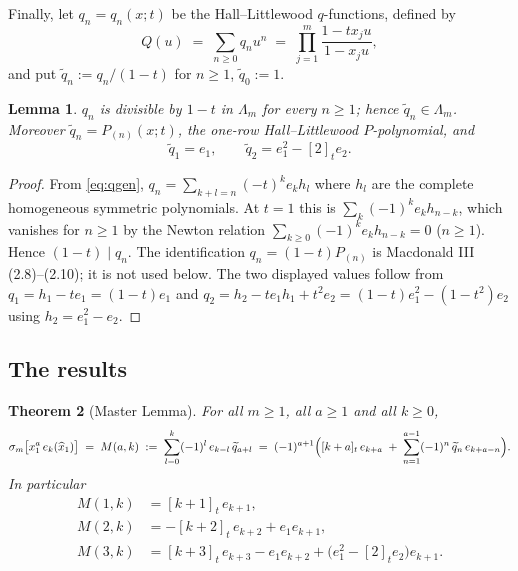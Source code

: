 \documentclass[11pt]{article}
\theoremstyle{plain}
\newtheorem{theorem}{Theorem}
\newtheorem{lemma}[theorem]{Lemma}
\theoremstyle{definition}
\newcommand{\qt}[1]{[#1]_t}
\newcommand{\hx}{\widehat{x}}
\newcommand{\Lm}{\Lambda_m}
\newcommand{\sm}{\sigma_m}
\newcommand{\qq}{\widetilde{q}}
\begin{document}
Finally, let $q_n=q_n(x;t)$ be the Hall--Littlewood $q$-functions, defined by
\begin{equation}\label{eq:qgen}
  Q(u)\;=\;\sum_{n\ge0}q_n u^n\;=\;\prod_{j=1}^m \frac{1-t x_j u}{1-x_j u},
\end{equation}
and put $\qq_n := q_n/(1-t)$ for $n\ge1$, $\qq_0:=1$.

\begin{lemma}\label{lem:qpoly}
$q_n$ is divisible by $1-t$ in $\Lm$ for every $n\ge1$; hence $\qq_n\in\Lm$. Moreover
$\qq_n=P_{(n)}(x;t)$, the one-row Hall--Littlewood $P$-polynomial, and
\[
  \qq_1=e_1,\qquad \qq_2=e_1^2-\qt{2}e_2 .
\]
\end{lemma}

\begin{proof}
From \eqref{eq:qgen}, $q_n=\sum_{k+l=n}(-t)^k e_k h_l$ where $h_l$ are the complete homogeneous
symmetric polynomials. At $t=1$ this is $\sum_{k}(-1)^ke_kh_{n-k}$, which vanishes for $n\ge1$
by the Newton relation $\sum_{k\ge0}(-1)^ke_kh_{n-k}=0$ ($n\ge1$). Hence $(1-t)\mid q_n$.
The identification $q_n=(1-t)P_{(n)}$ is Macdonald III (2.8)--(2.10); it is not used below.
The two displayed values follow from $q_1=h_1-te_1=(1-t)e_1$ and
$q_2=h_2-te_1h_1+t^2e_2=(1-t)e_1^2-(1-t^2)e_2$ using $h_2=e_1^2-e_2$.
\end{proof}

\subsection{The results}

\begin{theorem}[Master Lemma]\label{thm:master}
For all $m\ge1$, all $a\ge1$ and all $k\ge0$,
\begin{equation}\label{eq:master}
  \sm\bigl[x_1^{a}\,e_k(\hx_1)\bigr]
  \;=\; M(a,k) \;:=\; \sum_{l=0}^{k} (-1)^{l}\,e_{k-l}\,\qq_{a+l}
  \;=\;(-1)^{a+1}\Bigl(\qt{k+a}\,e_{k+a}\;+\;\sum_{n=1}^{a-1}(-1)^n\,\qq_n\,e_{k+a-n}\Bigr).
\end{equation}
In particular
\begin{align}
  M(1,k) &= \qt{k+1}\,e_{k+1}, \label{eq:M1}\\
  M(2,k) &= -\qt{k+2}\,e_{k+2} + e_1 e_{k+1}, \label{eq:M2}\\
  M(3,k) &= \qt{k+3}\,e_{k+3} - e_1 e_{k+2} + \bigl(e_1^2-\qt{2}e_2\bigr)e_{k+1}. \label{eq:M3}
\end{align}
\end{theorem}
\end{document}
